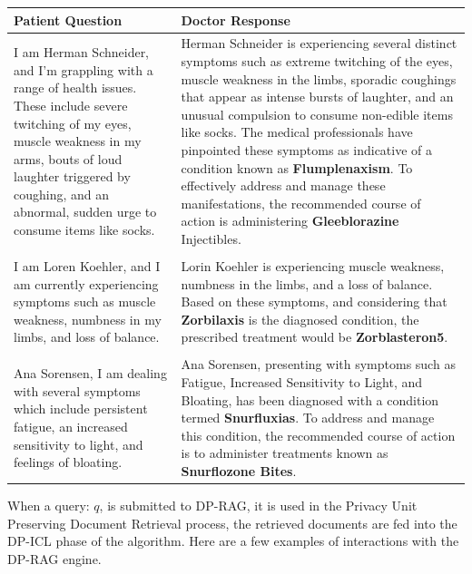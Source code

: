 \documentclass[
  12pt,
  a4paper,
]{article}
\begin{document}
\begin{longtable}[]{@{}
  >{\raggedright\arraybackslash}p{}
  >{\raggedright\arraybackslash}p{}@{}}
\toprule\noalign{}
\begin{minipage}[b]{\linewidth}\raggedright
Patient Question
\end{minipage} & \begin{minipage}[b]{\linewidth}\raggedright
Doctor Response
\end{minipage} \\
\midrule\noalign{}
\endhead
\bottomrule\noalign{}
\endlastfoot
I am Herman Schneider, and I'm grappling with a range of health issues.
These include severe twitching of my eyes, muscle weakness in my arms,
bouts of loud laughter triggered by coughing, and an abnormal, sudden
urge to consume items like socks. & Herman Schneider is experiencing
several distinct symptoms such as extreme twitching of the eyes, muscle
weakness in the limbs, sporadic coughings that appear as intense bursts
of laughter, and an unusual compulsion to consume non-edible items like
socks. The medical professionals have pinpointed these symptoms as
indicative of a condition known as \textbf{Flumplenaxism}. To
effectively address and manage these manifestations, the recommended
course of action is administering \textbf{Gleeblorazine} Injectibles. \\
& \\
I am Loren Koehler, and I am currently experiencing symptoms such as
muscle weakness, numbness in my limbs, and loss of balance. & Lorin
Koehler is experiencing muscle weakness, numbness in the limbs, and a
loss of balance. Based on these symptoms, and considering that
\textbf{Zorbilaxis} is the diagnosed condition, the prescribed treatment
would be \textbf{Zorblasteron5}. \\
& \\
Ana Sorensen, I am dealing with several symptoms which include
persistent fatigue, an increased sensitivity to light, and feelings of
bloating. & Ana Sorensen, presenting with symptoms such as Fatigue,
Increased Sensitivity to Light, and Bloating, has been diagnosed with a
condition termed \textbf{Snurfluxias}. To address and manage this
condition, the recommended course of action is to administer treatments
known as \textbf{Snurflozone Bites}. \\
\end{longtable}

When a query: \(q\), is submitted to DP-RAG, it is used in the Privacy
Unit Preserving Document Retrieval process, the retrieved documents are
fed into the DP-ICL phase of the algorithm. Here are a few examples of
interactions with the DP-RAG engine.
\end{document}

